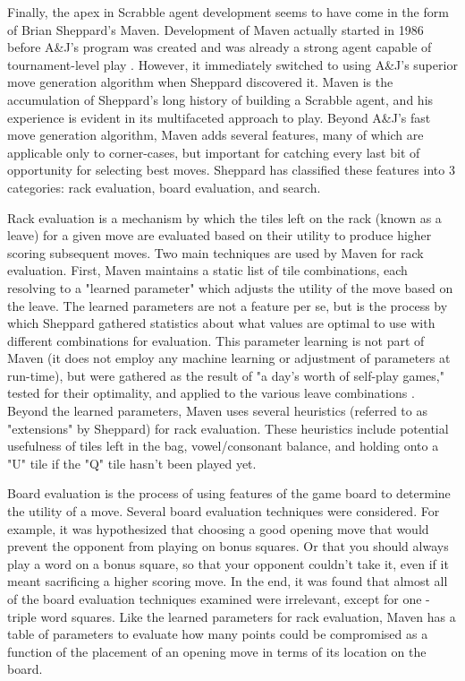 \documentclass[letterpaper]{article}
\begin{document}
Finally, the apex in Scrabble agent development seems to have come in the form of Brian Sheppard's Maven. Development of Maven actually started in 1986 before A\&J's program was created and was already a strong agent capable of tournament-level play \cite{Schaeffer2001}. However, it immediately switched to using A\&J's superior move generation algorithm when Sheppard discovered it. Maven is the accumulation of Sheppard's long history of building a Scrabble agent, and his experience is evident in its multifaceted approach to play. Beyond A\&J's fast move generation algorithm, Maven adds several features, many of which are applicable only to corner-cases, but important for catching every last bit of opportunity for selecting best moves. Sheppard has classified these features into 3 categories: rack evaluation, board evaluation, and search. 

Rack evaluation is a mechanism by which the tiles left on the rack (known as a leave) for a given move are evaluated based on their utility to produce higher scoring subsequent moves. Two main techniques are used by Maven for rack evaluation. First, Maven maintains a static list of tile combinations, each resolving to a "learned parameter" which adjusts the utility of the move based on the leave. The learned parameters are not a feature per se, but is the process by which Sheppard gathered statistics about what values are optimal to use with different combinations for evaluation. This parameter learning is not part of Maven (it does not employ any machine learning or adjustment of parameters at run-time), but were gathered as the result of "a day's worth of self-play games," tested for their optimality, and applied to the various leave combinations \cite{1sheppard2002}. Beyond the learned parameters, Maven uses several heuristics (referred to as "extensions" by Sheppard) for rack evaluation. These heuristics include potential usefulness of tiles left in the bag, vowel/consonant balance, and holding onto a "U" tile if the "Q" tile hasn't been played yet.

Board evaluation is the process of using features of the game board to determine the utility of a move. Several board evaluation techniques were considered. For example, it was hypothesized that choosing a good opening move that would prevent the opponent from playing on bonus squares. Or that you should always play a word on a bonus square, so that your opponent couldn't take it, even if it meant sacrificing a higher scoring move. In the end, it was found that almost all of the board evaluation techniques examined were irrelevant, except for one - triple word squares. Like the learned parameters for rack evaluation, Maven has a table of parameters to evaluate how many points could be compromised as a function of the placement of an opening move in terms of its location on the board.
\end{document}
